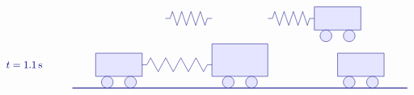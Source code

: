 \begin{solution}
\begin{itemize}
\begin{equation*}
\begin{tikzpicture}[scale=0.8, color=blue!50!black]
\begin{scope}[yshift=0cm]
\begin{scope}[xshift=8.4cm]
            \draw[fill=blue!10] (2,0.5) rectangle (4,1.5);
            \draw[fill=blue!10] (2.5,0.25) circle (0.25);
            \draw[fill=blue!10] (3.5,0.25) circle (0.25);
          \end{scope}
          \begin{scope}[xshift=4cm]
            \draw (0,1) -- ++(0.2,0) -- ++(0.1,0.3)
            -- ++(0.2,-0.6) -- ++(0.2,0.6)
            -- ++(0.2,-0.6) -- ++(0.2,0.6)
            -- ++(0.2,-0.6) -- ++(0.2,0.6)
            -- ++(0.2,-0.6) -- ++(0.1,0.3)
            -- ++(0.2,0);
          \end{scope}
          \begin{scope}[xshift=8.4cm]
            \draw (0,1) -- ++(0.2,0) -- ++(0.1,0.3)
            -- ++(0.2,-0.6) -- ++(0.2,0.6)
            -- ++(0.2,-0.6) -- ++(0.2,0.6)
            -- ++(0.2,-0.6) -- ++(0.2,0.6)
            -- ++(0.2,-0.6) -- ++(0.1,0.3)
            -- ++(0.2,0);
          \end{scope}
        \end{scope}
        \begin{scope}[yshift=-2cm]
          \draw (-3,1) node[right] {$t=1.1\s$};
          \draw[thick] (0,0) -- (14.4,0);
          \begin{scope}[xshift=-1cm]
            \draw[fill=blue!10] (2,0.5) rectangle (4,1.5);
            \draw[fill=blue!10] (2.5,0.25) circle (0.25);
            \draw[fill=blue!10] (3.5,0.25) circle (0.25);
          \end{scope}
          \begin{scope}[xshift=4.2cm]
            \draw[fill=blue!10] (1.8,0.5) rectangle (4.2,1.9);
            \draw[fill=blue!10] (2.5,0.25) circle (0.25);
            \draw[fill=blue!10] (3.5,0.25) circle (0.25);
          \end{scope}
          \begin{scope}[xshift=9.4cm]
            \draw[fill=blue!10] (2,0.5) rectangle (4,1.5);
            \draw[fill=blue!10] (2.5,0.25) circle (0.25);
            \draw[fill=blue!10] (3.5,0.25) circle (0.25);
          \end{scope}
          \begin{scope}[xshift=3cm]
            \draw (0,1) -- ++(0.2,0) -- ++(0.1625,0.3)
            -- ++(0.325,-0.6) -- ++(0.325,0.6)
            -- ++(0.325,-0.6) -- ++(0.325,0.6)
            -- ++(0.325,-0.6) -- ++(0.325,0.6)
            -- ++(0.325,-0.6) -- ++(0.1625,0.3)
            -- ++(0.2,0);
          \end{scope}
          \begin{scope}[xshift=8.4cm]

\end{scope}
\end{scope}
\end{tikzpicture}
\end{equation*}
\end{itemize}
\end{solution}
